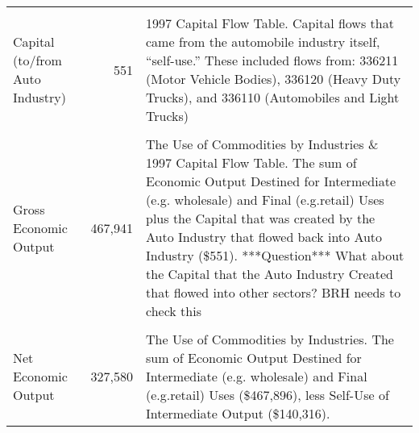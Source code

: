 \begin{table}
\begin{center}
\begin{tabular}{l r @{\hspace{2em}} p{7cm}}
&&\\
    Capital (to/from Auto Industry) &  551 & 1997 Capital Flow Table. Capital  flows that came from the automobile industry itself, ``self-use.''  These included flows from:  336211 (Motor Vehicle Bodies), 336120 (Heavy Duty Trucks), and 336110 (Automobiles and Light Trucks)      \\
&&\\
    Gross Economic Output & 467,941  &  The Use of Commodities by Industries \& 1997 Capital Flow Table. The sum of Economic Output Destined for Intermediate (e.g. wholesale) and Final (e.g.retail) Uses plus the Capital that was created by the Auto Industry that flowed back into Auto Industry (\$551). ***Question*** What about the Capital that the Auto Industry Created that flowed into other sectors? BRH needs to check this  \\ 
&&\\
    Net Economic Output & 327,580   &  The Use of Commodities by Industries. The sum of Economic Output Destined for Intermediate (e.g. wholesale) and Final (e.g.retail) Uses (\$467,896), less Self-Use of Intermediate Output (\$140,316).  \\
    \bottomrule
  \end{tabular}

\end{center}
\label{tab:calculations}
\end{table}







%
%

